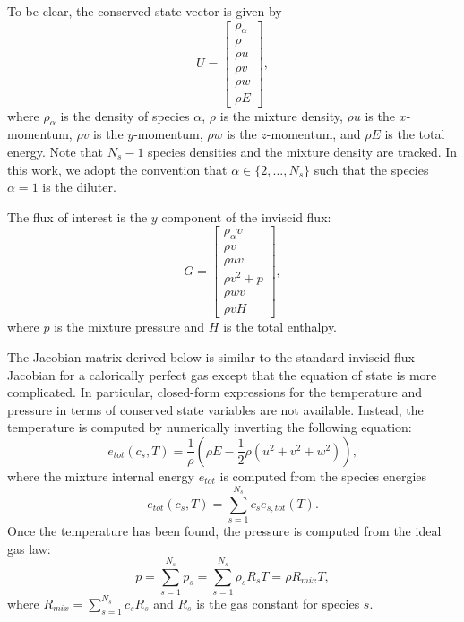 To be clear, the conserved state vector is given by
%
\begin{equation*}
U = \left[ \begin{array}{c}
\rho_{\alpha} \\
\rho \\
\rho u\\
\rho v \\
\rho w \\
\rho E
\end{array} \right],
\end{equation*}
%
where $\rho_{\alpha}$ is the density of species $\alpha$, $\rho$ is
the mixture density, $\rho u$ is the $x$-momentum, $\rho v$ is the
$y$-momentum, $\rho w$ is the $z$-momentum, and $\rho E$ is the total
energy.  Note that $N_s-1$ species densities and the mixture density
are tracked.  In this work, we adopt the convention that $\alpha \in
\{2, \ldots, N_s\}$ such that the species $\alpha = 1$ is the diluter.

The flux of interest is the $y$ component of the inviscid flux:
%
\begin{equation*}
G = \left[ \begin{array}{c}
\rho_{\alpha} v \\
\rho v \\
\rho u v\\
\rho v^2 + p \\
\rho w v \\
\rho v H
\end{array} \right],
\end{equation*}
%
where $p$ is the mixture pressure and $H$ is the total enthalpy.

The Jacobian matrix derived below is similar to the standard inviscid
flux Jacobian for a calorically perfect gas except that the equation
of state is more complicated.  In particular, closed-form expressions
for the temperature and pressure in terms of conserved state variables
are not available.  Instead, the temperature is computed by
numerically inverting the following equation:
%
\begin{equation}
\label{eqn:etot_T}
e_{tot}(c_s, T) = \frac{1}{\rho} \left( \rho E - \frac{1}{2} \rho (u^2 + v^2 + w^2) \right),
\end{equation}
% 
where the mixture internal energy $e_{tot}$ is computed from the
species energies
%
\begin{equation*}
e_{tot}(c_s, T) = \sum_{s=1}^{N_s} c_s e_{s,tot}(T).
\end{equation*}
%
Once the temperature has been found, the pressure is computed from the
ideal gas law:
%
\begin{equation*}
p = \sum_{s=1}^{N_s} p_s = \sum_{s=1}^{N_s} \rho_s R_s T = \rho R_{mix} T,
\end{equation*}
%
where $R_{mix} = \sum_{s=1}^{N_s} c_s R_s$ and $R_s$ is the gas
constant for species $s$.

